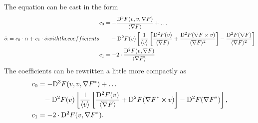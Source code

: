 The equation can be cast in the form
\begin{subequations}
    \begin{align}
        \ddot{ \alpha }   =
        c_0 \mult \alpha  +
        c_1 \mult \dot{ \alpha }
    \end{align}
    with the coefficients
    \begin{align}
        &\begin{aligned}
            c_0   &=
            - \frac{ \diff{3}{F}( v, v, \grad{F} ) }{ \skaq{\grad{F}} }  +  \dots \\
            &\hphantom{={}}- \diff{2}{F}( v )
            \left[ \frac{ 1 }{ \skaq{v} }
            \left[ \frac{ \diff{2}{F}( v ) }{ \skaq{\grad{F}} }  +
            \frac{ \diff{2}{F}( \grad{F} \times v ) }{ \skaq{\grad{F}}^2 } \right]  -
            \frac{ \diff{2}{F}( \grad{F} ) }{ \skaq{\grad{F}}^2 } \right]
        \end{aligned}\\
        &c_1   =
        - 2 \mult \frac{ \diff{2}{F}( v, \grad{F} ) }{ \skaq{\grad{F}} }
    \end{align}
\end{subequations}
The coefficients can be rewritten a little more compactly as
\begin{subequations}
    \begin{align}
        &\begin{aligned}
            c_0   &=
            - \mathrm{D}^{ 3 }F( v, v, {\nabla F}^* )  +  \dots \\
            &\hphantom{=}-\mathrm{D}^{ 2 }F( v )
            \left[ \frac{ 1 }{ \langle v \rangle }
            \left[ \frac{ \mathrm{D}^{ 2 }F( v ) }{ \langle \nabla F \rangle }  +
            \mathrm{D}^{ 2 }F( {\nabla F}^* \times v ) \right]  -
            \mathrm{D}^{ 2 }F( {\nabla F}^* ) \right] ,
        \end{aligned}\\
        &c_1   =   - 2 \cdot \mathrm{D}^{ 2 }F( v, {\nabla F}^* ) .
    \end{align}
\end{subequations}




